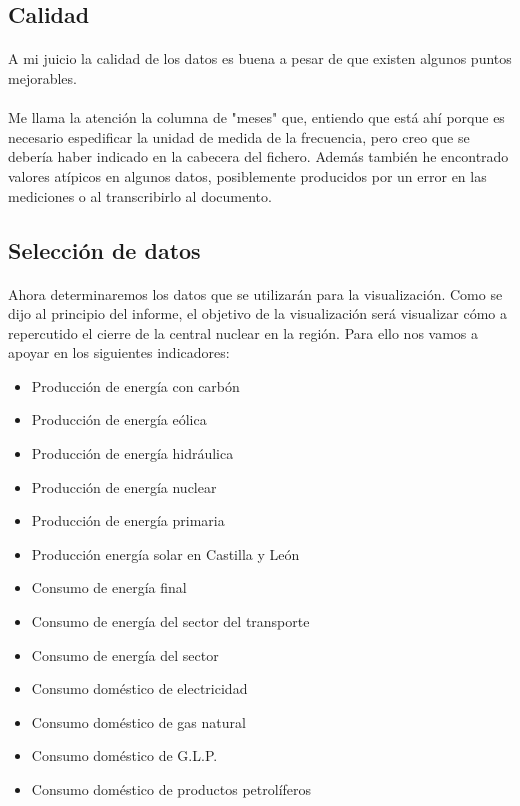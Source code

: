 \documentclass{article}
\begin{document}
		\subsection{Calidad}

			\paragraph{}
			A mi juicio la calidad de los datos es buena a pesar de que existen algunos puntos  mejorables.

			\paragraph{}
			Me llama la atención la columna de "meses" que, entiendo que está ahí porque es necesario espedificar la unidad de medida de la frecuencia, pero creo que se debería haber indicado en la cabecera del fichero. Además también he encontrado valores atípicos en algunos datos, posiblemente producidos por un error en las mediciones o al transcribirlo al documento.

		\subsection{Selección de datos}

			\paragraph{}
			Ahora determinaremos los datos que se utilizarán para la visualización. Como se dijo al principio del informe, el objetivo de la visualización será visualizar cómo a repercutido el cierre de la central nuclear en la región. Para ello nos vamos a apoyar en los siguientes indicadores:

			\begin{itemize}
				\item Producción de energía con carbón
				\item Producción de energía eólica
				\item Producción de energía hidráulica
				\item Producción de energía nuclear
				\item Producción de energía primaria
				\item Producción energía solar en Castilla y León
				\item Consumo de energía final
				\item Consumo de energía del sector del transporte
				\item Consumo de energía del sector
				\item Consumo doméstico de electricidad
				\item Consumo doméstico de gas natural
				\item Consumo doméstico de G.L.P.
				\item Consumo doméstico de productos petrolíferos
			\end{itemize}
\end{document}
